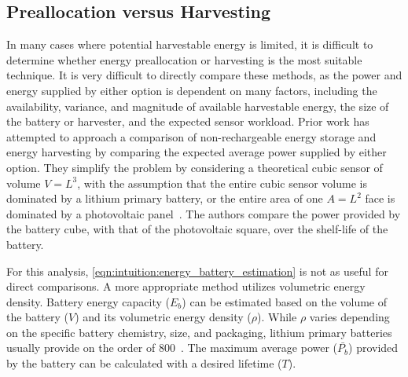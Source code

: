 \subsection{Preallocation versus Harvesting}
\label{sec:intuition:energy_income_pvh}
In many cases where potential harvestable energy is limited, it is difficult to determine whether energy preallocation or harvesting is the most suitable technique.
It is very difficult to directly compare these methods, as the power and energy supplied by either option is dependent on many factors, including the availability, variance, and magnitude of available harvestable energy, the size of the battery or harvester, and the expected sensor workload. 
Prior work has attempted to approach a comparison of non-rechargeable energy storage and energy harvesting by comparing the expected average power supplied by either option. 
They simplify the problem by considering a theoretical cubic sensor of volume $V = L^3$, 
with the assumption that the entire cubic sensor volume is dominated by a lithium primary battery, or the entire area of one $A = L^2$ face is dominated by a photovoltaic panel~\cite{yervaGrafting12}.
The authors compare the power provided by the battery cube, with that of the photovoltaic square, over the shelf-life of the battery. 

For this analysis, \cref{eqn:intuition:energy_battery_estimation} is not as useful for direct comparisons. 
A more appropriate method utilizes volumetric energy density.
Battery energy capacity ($E_b$) can be estimated based on the volume of the battery ($V$) and its volumetric energy density ($\rho$).
While $\rho$ varies depending on the specific battery chemistry, size, and packaging, lithium primary batteries usually provide on the order of 800\ssi[per-mode=symbol]{\milli\Wh\per\cm\cubed}~\cite{tuna2016energy}. The maximum average power ($\bar{P_b}$) provided by the battery can be calculated with a desired lifetime ($T$). 

